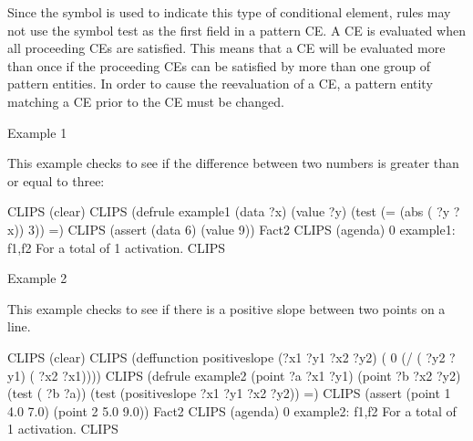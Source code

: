 \documentclass[letterpaper,10pt,english]{sphinxmanual}
\begin{document}
\begin{sphinxVerbatim}[commandchars=\\\{\}]
   
\end{sphinxVerbatim}

Since the symbol  is used to indicate this type of conditional
element, rules may not use the symbol test as the first field in a
pattern CE. A  CE is evaluated when all proceeding CEs are
satisfied. This means that a  CE will be evaluated more than
once if the proceeding CEs can be satisfied by more than one group of
pattern entities. In order to cause the reevaluation of a  CE, a
pattern entity matching a CE prior to the  CE must be changed.

Example 1

This example checks to see if the difference between two numbers is
greater than or equal to three:

\begin{sphinxVerbatim}[commandchars=\\\{\}]
CLIPS\PYGZgt{} (clear)
CLIPS\PYGZgt{}
(defrule example\PYGZhy{}1
  (data ?x)
  (value ?y)
  (test (\PYGZgt{}= (abs (\PYGZhy{} ?y ?x)) 3))
 =\PYGZgt{})
CLIPS\PYGZgt{} (assert (data 6) (value 9))
\PYGZlt{}Fact\PYGZhy{}2\PYGZgt{}
CLIPS\PYGZgt{} (agenda)
0 example\PYGZhy{}1: f\PYGZhy{}1,f\PYGZhy{}2
For a total of 1 activation.
CLIPS\PYGZgt{}
\end{sphinxVerbatim}

Example 2

This example checks to see if there is a positive slope between two
points on a line.

\begin{sphinxVerbatim}[commandchars=\\\{\}]
CLIPS\PYGZgt{} (clear)
CLIPS\PYGZgt{}
(deffunction positive\PYGZhy{}slope
  (?x1 ?y1 ?x2 ?y2)
  (\PYGZlt{} 0 (/ (\PYGZhy{} ?y2 ?y1) (\PYGZhy{} ?x2 ?x1))))
CLIPS\PYGZgt{}
(defrule example\PYGZhy{}2
  (point ?a ?x1 ?y1)
  (point ?b ?x2 ?y2)
  (test (\PYGZgt{} ?b ?a))
  (test (positive\PYGZhy{}slope ?x1 ?y1 ?x2 ?y2))
 =\PYGZgt{})
CLIPS\PYGZgt{}
(assert (point 1 4.0 7.0) (point 2 5.0 9.0))
\PYGZlt{}Fact\PYGZhy{}2\PYGZgt{}
CLIPS\PYGZgt{} (agenda)
0 example\PYGZhy{}2: f\PYGZhy{}1,f\PYGZhy{}2
For a total of 1 activation.
CLIPS\PYGZgt{}
\end{sphinxVerbatim}
\end{document}
